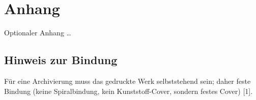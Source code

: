 \chapter{Anhang}
Optionaler Anhang \dots

\section{Hinweis zur Bindung}
Für eine Archivierung muss das gedruckte Werk selbststehend sein; daher feste Bindung
(keine Spiralbindung, kein Kunststoff-Cover, sondern festes Cover) [1].
